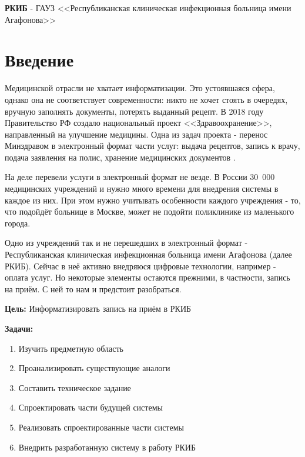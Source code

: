 \documentclass[a4paper,article]{article}
\begin{document}
    \textbf{РКИБ} - ГАУЗ <<Республиканская клиническая инфекционная больница имени Агафонова>>

    \newpage

    \section*{Введение}

        Медицинской отрасли не хватает информатизации. Это устоявшаяся сфера, однако она не соответствует современности: никто не хочет стоять в очередях, вручную заполнять документы, потерять выданный рецепт. В 2018 году Правительство РФ создало национальный проект <<Здравоохранение>>, направленный на улучшение медицины. Одна из задач проекта - перенос Минздравом в электронный формат части услуг: выдача рецептов, запись к врачу, подача заявления на полис, хранение медицинских документов \cite{natsproektzdravoohranenie}.

        На деле перевели услуги в электронный формат не везде. В России 30~000 медицинских учреждений и нужно много времени для внедрения системы в каждое из них. При этом нужно учитывать особенности каждого учреждения - то, что подойдёт больнице в Москве, может не подойти поликлинике из маленького города.

        Одно из учреждений так и не перешедших в электронный формат - Республиканская клиническая инфекционная больница имени Агафонова (далее РКИБ). Сейчас в неё активно внедряюся цифровые технологии, например - оплата услуг. Но некоторые элементы остаются прежними, в частности, запись на приём. С ней то нам и предстоит разобраться.

        \textbf{Цель:} Информатизировать запись на приём в РКИБ

        \textbf{Задачи:}

        \begin{enumerate}[nolistsep]
            \item Изучить предметную область
            \item Проанализировать существующие аналоги
            \item Составить техническое задание
            \item Спроектировать части будущей системы
            \item Реализовать спроектированные части системы
            \item Внедрить разработанную систему в работу РКИБ
        \end{enumerate}
\end{document}
